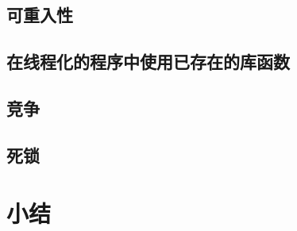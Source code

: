 \pending

\subsection{可重入性}

\pending

\subsection{在线程化的程序中使用已存在的库函数}

\pending

\subsection{竞争}

\pending

\subsection{死锁}

\pending

\section{小结}

\pending

